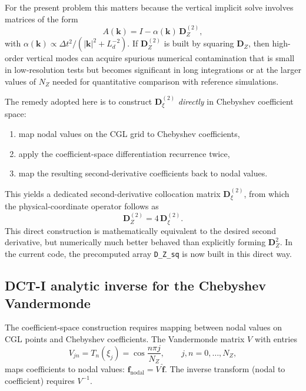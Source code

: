 \documentclass[11pt]{article}
\newcommand{\Ld}{L_d}
\newcommand{\kh}{|\bm{k}|}
\newcommand{\Dvec}{\bm{D}}
\begin{document}
For the present problem this matters because the vertical implicit solve involves matrices of the form
\begin{equation}
A(\bm{k}) = I - \alpha(\bm{k})\,\Dvec_Z^{(2)},
\end{equation}
with $\alpha(\bm{k}) \propto \Delta t^2/(\kh^2+\Ld^{-2})$. If $\Dvec_Z^{(2)}$ is built by squaring $\Dvec_Z$, then high-order vertical modes can acquire spurious numerical contamination that is small in low-resolution tests but becomes significant in long integrations or at the larger values of $N_Z$ needed for quantitative comparison with reference simulations.

The remedy adopted here is to construct $\Dvec_\xi^{(2)}$ \emph{directly} in Chebyshev coefficient space:
\begin{enumerate}[nosep]
\item map nodal values on the CGL grid to Chebyshev coefficients,
\item apply the coefficient-space differentiation recurrence twice,
\item map the resulting second-derivative coefficients back to nodal values.
\end{enumerate}
This yields a dedicated second-derivative collocation matrix $\Dvec_\xi^{(2)}$, from which the physical-coordinate operator follows as
\begin{equation}
\Dvec_Z^{(2)} = 4\,\Dvec_\xi^{(2)}.
\end{equation}
This direct construction is mathematically equivalent to the desired second derivative, but numerically much better behaved than explicitly forming $\Dvec_Z^2$. In the current code, the precomputed array \texttt{D\_Z\_sq} is now built in this direct way.

\subsection{DCT-I analytic inverse for the Chebyshev Vandermonde}
\label{sec:dct_inverse}

The coefficient-space construction requires mapping between nodal values on CGL points and Chebyshev coefficients. The Vandermonde matrix $V$ with entries
\begin{equation}
V_{jn} = T_n(\xi_j) = \cos\!\frac{n\pi j}{N_Z}, \qquad j, n = 0, \ldots, N_Z,
\end{equation}
maps coefficients to nodal values: $\bm{f}_{\mathrm{nodal}} = V\,\hat{\bm{f}}$. The inverse transform (nodal to coefficient) requires $V^{-1}$.
\end{document}
